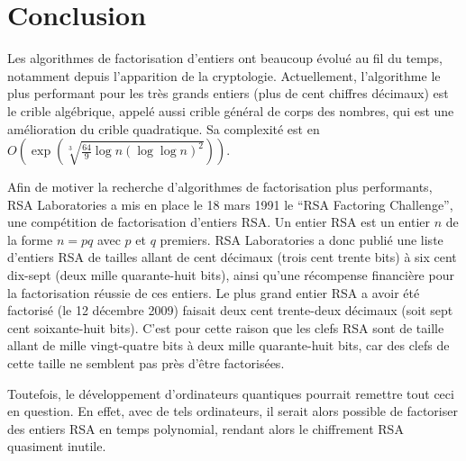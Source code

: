 \documentclass[french, 12pt, titlepage]{article}
\begin{document}
\section{Conclusion}

Les algorithmes de factorisation d'entiers ont beaucoup évolué au fil du temps, notamment depuis l'apparition de la cryptologie.
Actuellement, l'algorithme le plus performant pour les très grands entiers (plus de cent chiffres décimaux) est le crible algébrique, appelé aussi crible général de corps des nombres,
qui est une amélioration du crible quadratique.
Sa complexité est en $O(\exp(\sqrt[3]{\frac{64}{9}\log n (\log \log n)^2})).$

Afin de motiver la recherche d'algorithmes de factorisation plus performants, RSA Laboratories a mis en place le 18 mars 1991 le ``RSA Factoring Challenge'', une compétition de factorisation d'entiers RSA.
Un entier RSA est un entier $n$ de la forme $n = pq$ avec $p$ et $q$ premiers.
RSA Laboratories a donc publié une liste d'entiers RSA de tailles allant de cent décimaux (trois cent trente bits) à six cent dix-sept (deux mille quarante-huit bits),
ainsi qu'une récompense financière pour la factorisation réussie de ces entiers.
Le plus grand entier RSA a avoir été factorisé (le 12 décembre 2009) faisait deux cent trente-deux décimaux (soit sept cent soixante-huit bits).
C'est pour cette raison que les clefs RSA sont de taille allant de mille vingt-quatre bits à deux mille quarante-huit bits, car des clefs de cette taille ne semblent pas près d'être factorisées.

Toutefois, le développement d'ordinateurs quantiques pourrait remettre tout ceci en question. En effet, avec de tels ordinateurs, il serait alors possible de factoriser des entiers RSA en temps polynomial,
rendant alors le chiffrement RSA quasiment inutile.
\end{document}
